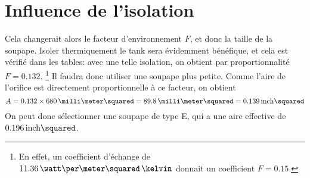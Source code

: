 \section{Influence de l'isolation}
Cela changerait alors le facteur d'environnement $F$,
et donc la taille de la soupape.
Isoler thermiquement le tank sera évidemment bénéfique,
et cela est vérifié dans les tables:
avec une telle isolation, on obtient par proportionnalité $F=0.132$.%
\footnote{En effet, un coefficient d'échange de
$11.36\,\watt\per\meter\squared\,\kelvin$
donnait un coefficient $F=0.15$.}
Il faudra donc utiliser une soupape plus petite.
Comme l'aire de l'orifice est directement proportionnelle à ce facteur, on obtient
\begin{equation*}
    A = 0.132 \times 680\,\milli\meter\squared
    = 89.8\,\milli\meter\squared = 0.139\,\inch\squared
\end{equation*}
On peut donc sélectionner une soupape de type E,
qui a une aire effective de $0.196\,\inch\squared$.
